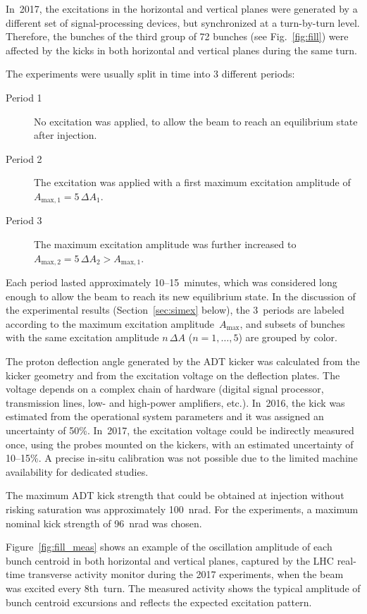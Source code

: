 \documentclass[aps
,prstab
,reprint
,longbibliography
,preprintnumbers
,showkeys
,amsfonts,amssymb,amsmath
,floatfix
]{revtex4-1}
\begin{document}
In~2017, the excitations in the horizontal and vertical planes were
generated by a different set of signal-processing devices, but
synchronized at a turn-by-turn level. Therefore, the bunches of the
third group of 72 bunches (see Fig.~\ref{fig:fill}) were affected by
the kicks in both horizontal and vertical planes during the same turn.

The experiments were usually split in time into 3 different periods:
%
\begin{description}
\item[Period 1] No excitation was applied, to allow the beam to reach
  an equilibrium state after injection.
\item[Period 2] The excitation was applied with a first maximum
  excitation amplitude of $A_{\mathrm{max,1}} = 5 \, \Delta A_1$.
\item[Period 3] The maximum excitation amplitude was further increased
  to $A_{\mathrm{max,2}} = 5 \, \Delta A_2 > A_{\mathrm{max,1}}$.
\end{description}
%
Each period lasted approximately 10--15~minutes, which was considered
long enough to allow the beam to reach its new equilibrium state. In
the discussion of the experimental results (Section~\ref{sec:simex}
below), the 3~periods are labeled according to the maximum excitation
amplitude~$A_\mathrm{max}$, and subsets of bunches with the same
excitation amplitude $n \, \Delta A$ ($n = 1, \ldots, 5$) are grouped
by color.

The proton deflection angle generated by the ADT kicker was calculated
from the kicker geometry and from the excitation voltage on the
deflection plates. The voltage depends on a complex chain of hardware
(digital signal processor, transmission lines, low- and high-power
amplifiers, etc.). In~2016, the kick was estimated from the
operational system parameters and it was assigned an uncertainty of
50\%. In~2017, the excitation voltage could be indirectly measured
once, using the probes mounted on the kickers, with an estimated
uncertainty of 10--15\%. A precise in-situ calibration was not
possible due to the limited machine availability for dedicated
studies.

The maximum ADT kick strength that could be obtained at injection
without risking saturation was approximately 100~nrad. For the
experiments, a maximum nominal kick strength of 96~nrad was chosen.

Figure~\ref{fig:fill_meas} shows an example of the oscillation
amplitude of each bunch centroid in both horizontal and vertical
planes, captured by the LHC real-time transverse activity monitor
during the 2017 experiments, when the beam was excited every
8th~turn. The measured activity shows the typical amplitude of bunch
centroid excursions and reflects the expected excitation pattern.
\end{document}

